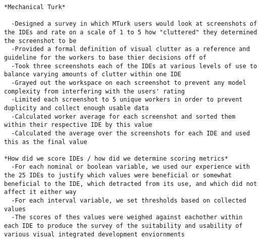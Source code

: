 \begin{verbatim}
*Mechanical Turk*

  -Designed a survey in which MTurk users would look at screenshots of the IDEs and rate on a scale of 1 to 5 how "cluttered" they determined the screenshot to be
  -Provided a formal definition of visual clutter as a reference and guideline for the workers to base thier decisions off of
  -Took three screenshots each of the IDEs at various levels of use to balance varying amounts of clutter within one IDE
  -Grayed out the workspace on each screenshot to prevent any model complexity from interfering with the users' rating
  -Limited each screenshot to 5 unique workers in order to prevent duplicity and collect enough usable data
  -Calculated worker average for each screenshot and sorted them within their respective IDE by this value
  -Calculated the average over the screenshots for each IDE and used this as the final value

*How did we score IDEs / how did we determine scoring metrics*
  -For each nominal or boolean variable, we used our experience with the 25 IDEs to justify which values were beneficial or somewhat beneficial to the IDE, which detracted from its use, and which did not affect it either way
  -For each interval variable, we set thresholds based on collected values 
  -The scores of thes values were weighed against eachother within each IDE to produce the survey of the suitability and usability of various visual integrated development enviornments
\end{verbatim}
